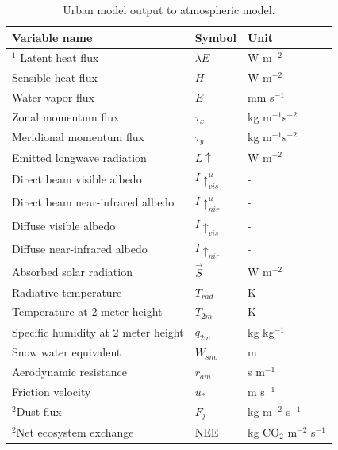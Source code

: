 \documentclass[12pt,authoryear]{elsarticle}
\numberwithin{equation}{section} %
\begin{document}
\begin{table}[H]
\centering
\caption{Urban model output to atmospheric model.}
\label{tab:urban_output}
\begin{tabular}{p{8cm}p{3cm}p{3cm}}
\toprule
Variable name & Symbol & Unit \\
\midrule
$^{1}$ Latent heat flux & $\lambda E$ & W m$^{-2}$ \\
Sensible heat flux & $H$ & W m$^{-2}$ \\
Water vapor flux & $E$ & mm s$^{-1}$ \\
Zonal momentum flux & $\tau_{x}$ & kg m$^{-1}$s$^{-2}$ \\
Meridional momentum flux & $\tau_{y}$ & kg m$^{-1}$s$^{-2}$ \\
Emitted longwave radiation & $L {\uparrow}$ & W m$^{-2}$\\
Direct beam visible albedo & $I {\uparrow}_{vis}^{\mu}$ & - \\
Direct beam near-infrared albedo & $I {\uparrow}_{nir}^{\mu}$ & - \\
Diffuse visible albedo & $I {\uparrow}_{vis}$ & - \\
Diffuse near-infrared albedo & $I {\uparrow}_{nir}$ & - \\
Absorbed solar radiation & $\overrightarrow{S}$ & W m$^{-2}$ \\
Radiative temperature & $T_{rad}$ & K \\
Temperature at 2 meter height & $T_{2m}$ & K \\
Specific humidity at 2 meter height & $q_{2m}$ & kg kg$^{-1}$ \\
Snow water equivalent & $W_{sno}$ & m \\
Aerodynamic resistance & $r_{am}$ & s m$^{-1}$\\
Friction velocity & $u_{*}$ & m s$^{-1}$ \\
$^{2}$Dust flux & $F_{j}$ & kg m$^{-2}$ s$^{-1}$ \\
$^{2}$Net ecosystem exchange & NEE & kg CO$_{2}$ m$^{-2}$ s$^{-1}$\\
\bottomrule
\end{tabular}
\end{table}
\end{document}
